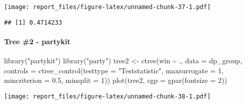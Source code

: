 \documentclass[
]{article}
\newenvironment{Shaded}{\begin{snugshade}}{\end{snugshade}}
\newcommand{\AttributeTok}[1]{\textcolor[rgb]{0.77,0.63,0.00}{#1}}
\newcommand{\DecValTok}[1]{\textcolor[rgb]{0.00,0.00,0.81}{#1}}
\newcommand{\FloatTok}[1]{\textcolor[rgb]{0.00,0.00,0.81}{#1}}
\newcommand{\FunctionTok}[1]{\textcolor[rgb]{0.00,0.00,0.00}{#1}}
\newcommand{\NormalTok}[1]{#1}
\newcommand{\OtherTok}[1]{\textcolor[rgb]{0.56,0.35,0.01}{#1}}
\newcommand{\SpecialCharTok}[1]{\textcolor[rgb]{0.00,0.00,0.00}{#1}}
\newcommand{\StringTok}[1]{\textcolor[rgb]{0.31,0.60,0.02}{#1}}
\begin{document}
\texttt{[image: report\_files/figure-latex/unnamed-chunk-37-1.pdf]}

\begin{Shaded}
\end{Shaded}

\begin{verbatim}
## [1] 0.4714233
\end{verbatim}

\hypertarget{tree-2---partykit}{%
\paragraph{Tree \#2 - partykit}\label{tree-2---partykit}}

\begin{Shaded}
\begin{Highlighting}[]
\FunctionTok{library}\NormalTok{(}\StringTok{"partykit"}\NormalTok{)}
\FunctionTok{library}\NormalTok{(}\StringTok{"party"}\NormalTok{)}
\NormalTok{tree2 }\OtherTok{\textless{}{-}} \FunctionTok{ctree}\NormalTok{(win }\SpecialCharTok{\textasciitilde{}}\NormalTok{ ., }\AttributeTok{data =}\NormalTok{ dp\_group, }\AttributeTok{controls =} \FunctionTok{ctree\_control}\NormalTok{(}\AttributeTok{testtype =} \StringTok{"Teststatistic"}\NormalTok{, }\AttributeTok{maxsurrogate =} \DecValTok{1}\NormalTok{, }\AttributeTok{mincriterion =} \FloatTok{0.5}\NormalTok{, }\AttributeTok{minsplit =} \DecValTok{1}\NormalTok{))}
\FunctionTok{plot}\NormalTok{(tree2, }\AttributeTok{cgp =} \FunctionTok{gpar}\NormalTok{(}\AttributeTok{fontsize =} \DecValTok{2}\NormalTok{))}
\end{Highlighting}
\end{Shaded}

\texttt{[image: report\_files/figure-latex/unnamed-chunk-38-1.pdf]}

\begin{Shaded}
\end{Shaded}
\end{document}
